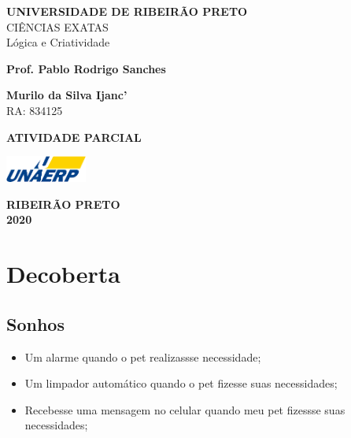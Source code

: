 \documentclass[12pt,a4paper]{article}
\let\oldsection\section
\renewcommand\section{\clearpage\oldsection}
\begin{document}
\begin{titlepage}
	\begin{center}
		\textbf{UNIVERSIDADE DE RIBEIRÃO PRETO} \\
			CIÊNCIAS EXATAS \\
			Lógica e Criatividade

			\vspace{1.5cm}

			\textbf{Prof. Pablo Rodrigo Sanches}
			\vspace{0.5cm}

			\textbf{Murilo da Silva Ijanc'} \\
			RA: 834125

			\vspace{6.5cm}

			\textbf{ATIVIDADE PARCIAL}

			\vfill

			\vspace{0.8cm}

			\includegraphics[width=0.2\textwidth]{unaerp}

			\textbf{RIBEIRÃO PRETO} \\
			\textbf{2020}
	\end{center}
\end{titlepage}


\thispagestyle{empty}

\tableofcontents

\newpage

\thispagestyle{empty}
\listoffigures
\thispagestyle{empty}


\section{Decoberta}

\subsection{Sonhos}
\begin{itemize}
	\item Um alarme quando o pet realizassse necessidade;
	\item Um limpador automático quando o pet fizesse suas necessidades;
	\item Recebesse uma mensagem no celular quando meu pet fizessse suas
		necessidades;
\end{itemize}
\end{document}
